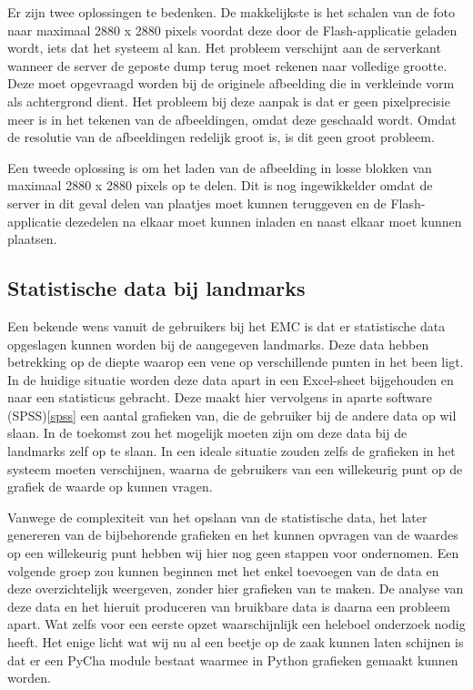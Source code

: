 Er zijn twee oplossingen te bedenken. De makkelijkste is het schalen van de foto naar maximaal 2880 x 2880 pixels voordat deze door de Flash-applicatie geladen wordt, iets dat het systeem al kan. Het probleem verschijnt aan de serverkant wanneer de server de geposte dump terug moet rekenen naar volledige grootte. Deze moet opgevraagd worden bij de originele afbeelding die in verkleinde vorm als achtergrond dient. Het probleem bij deze aanpak is dat er geen pixelprecisie meer is in het tekenen van de afbeeldingen, omdat deze geschaald wordt. Omdat de resolutie van de afbeeldingen redelijk groot is, is dit geen groot probleem.

Een tweede oplossing is om het laden van de afbeelding in losse blokken van maximaal 2880 x 2880 pixels op te delen. Dit is nog ingewikkelder omdat de server in dit geval delen van plaatjes moet kunnen teruggeven en de Flash-applicatie dezedelen na elkaar moet kunnen inladen en naast elkaar moet kunnen plaatsen.

\subsection{Statistische data bij landmarks} %
Een bekende wens vanuit de gebruikers bij het EMC is dat er statistische data opgeslagen kunnen worden bij de aangegeven landmarks.
Deze data hebben betrekking op de diepte waarop een vene op verschillende punten in het been ligt.
In de huidige situatie worden deze data apart in een Excel-sheet bijgehouden en naar een statisticus gebracht.
Deze maakt hier vervolgens in aparte software (SPSS)\ref{spss} een aantal grafieken van, die de gebruiker bij de andere data op wil slaan.
In de toekomst zou het mogelijk moeten zijn om deze data bij de landmarks zelf op te slaan.
In een ideale situatie zouden zelfs de grafieken in het systeem moeten verschijnen, waarna de gebruikers van een willekeurig punt op de grafiek de waarde op kunnen vragen.

Vanwege de complexiteit van het opslaan van de statistische data, het later genereren van de bijbehorende grafieken en het kunnen opvragen van de waardes op een willekeurig punt hebben wij hier nog geen stappen voor ondernomen.
Een volgende groep zou kunnen beginnen met het enkel toevoegen van de data en deze overzichtelijk weergeven, zonder hier grafieken van te maken.
De analyse van deze data en het hieruit produceren van bruikbare data is daarna een probleem apart.
Wat zelfs voor een eerste opzet waarschijnlijk een heleboel onderzoek nodig heeft.
Het enige licht wat wij nu al een beetje op de zaak kunnen laten schijnen is dat er een PyCha module bestaat waarmee in Python grafieken gemaakt kunnen worden.

